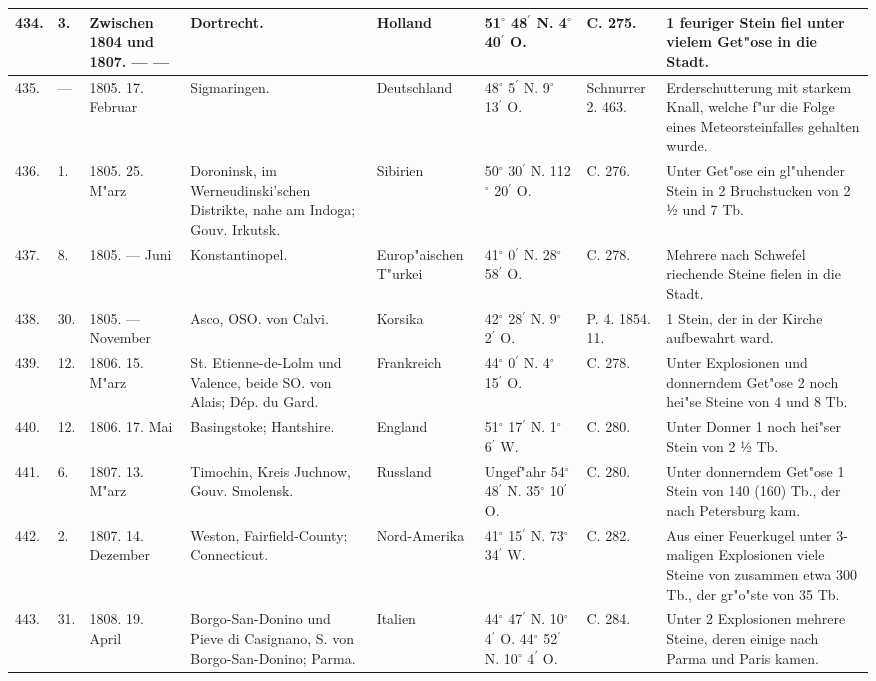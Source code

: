 \documentclass[a4paper, 8pt, oneside, polutonikogreek, german]{article}
\begin{document}
\begin{center}
\begin{longtable}{| p{4mm} | p{2mm} | p{15mm} | p{25mm} | p{16mm} | p{12mm} | p{13mm} | p{20mm} |}
        434. & 3. & Zwischen 1804 und 1807. --- --- & Dortrecht. & Holland & 51$^\circ$ 48$^\prime$ N. 4$^\circ$ 40$^\prime$ O. & C. 275. & 1 feuriger Stein fiel unter vielem Get"ose in die Stadt. \\ \hline
        435. & --- & 1805. 17. Februar & Sigmaringen. & Deutschland & 48$^\circ$ 5$^\prime$ N. 9$^\circ$ 13$^\prime$ O. & Schnurrer 2. 463. & Erderschutterung mit starkem Knall, welche f"ur die Folge eines Meteorsteinfalles gehalten wurde. \\ \hline
        436. & 1. & 1805. 25. M"arz & Doroninsk, im Werneudinski’schen Distrikte, nahe am Indoga; Gouv. Irkutsk. & Sibirien & 50$^\circ$ 30$^\prime$ N. 112$^\circ$ 20$^\prime$ O. & C. 276. & Unter Get"ose ein gl"uhender Stein in 2 Bruchstucken von 2 ½ und 7 Tb. \\ \hline
        437. & 8. & 1805. --- Juni & Konstantinopel. & Europ"aischen T"urkei & 41$^\circ$ 0$^\prime$ N. 28$^\circ$ 58$^\prime$ O. & C. 278. & Mehrere nach Schwefel riechende Steine fielen in die Stadt. \\ \hline
        438. & 30. & 1805. --- November & Asco, OSO. von Calvi. & Korsika & 42$^\circ$ 28$^\prime$ N. 9$^\circ$ 2$^\prime$ O. & P. 4. 1854. 11. & 1 Stein, der in der Kirche aufbewahrt ward. \\ \hline
        439. & 12. & 1806. 15. M"arz & St. Etienne-de-Lolm und Valence, beide SO. von Alais; Dép. du Gard. & Frankreich & 44$^\circ$ 0$^\prime$ N. 4$^\circ$ 15$^\prime$ O. & C. 278. & Unter Explosionen und donnerndem Get"ose 2 noch hei"se Steine von 4 und 8 Tb. \\ \hline
        440. & 12. & 1806. 17. Mai & Basingstoke; Hantshire. & England & 51$^\circ$ 17$^\prime$ N. 1$^\circ$ 6$^\prime$ W. & C. 280. & Unter Donner 1 noch hei"ser Stein von 2 ½ Tb. \\ \hline
        441. & 6. & 1807. 13. M"arz & Timochin, Kreis Juchnow, Gouv. Smolensk. & Russland & Ungef"ahr 54$^\circ$ 48$^\prime$ N. 35$^\circ$ 10$^\prime$ O. & C. 280. & Unter donnerndem Get"ose 1 Stein von 140 (160) Tb., der nach Petersburg kam. \\ \hline
        442. & 2. & 1807. 14. Dezember & Weston, Fairfield-County; Connecticut. & Nord-Amerika & 41$^\circ$ 15$^\prime$ N. 73$^\circ$ 34$^\prime$ W. & C. 282. & Aus einer Feuerkugel unter 3-maligen Explosionen viele Steine von zusammen etwa 300 Tb., der gr"o"ste von 35 Tb. \\ \hline
        443. & 31. & 1808. 19. April & Borgo-San-Donino und Pieve di Casignano, S. von Borgo-San-Donino; Parma. & Italien & 44$^\circ$ 47$^\prime$ N. 10$^\circ$ 4$^\prime$ O. 44$^\circ$ 52$^\prime$ N. 10$^\circ$ 4$^\prime$ O. & C. 284. & Unter 2 Explosionen mehrere Steine, deren einige nach Parma und Paris kamen. \\ \hline

\end{longtable}
\end{center}
\end{document}
